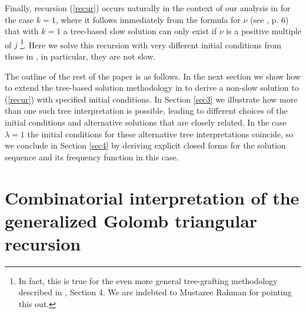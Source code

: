 \documentclass[12pt]{amsart}
\numberwithin{equation}{section}
\numberwithin{theorem}{section}
\numberwithin{table}{section}
\numberwithin{figure}{section}
\begin{document}
\iffalse
; concurrently, as we soon show, we identified that the initial conditions of interest consist of $s+1$ 1s followed by $j$ repetitions of the value $j+1$.

The natural generalization of Golomb's recursion with $j=\lambda=1$ but any $s \geq 0$ and $s+1$ initial values all equal to 1 is discussed briefly in \cite{Rpaper} and \cite{NonHomog}. There it is observed that the solution has a combinatorial interpretation in terms of counting leaves in a certain infinite unary tree, so is slow, and has frequency function $\phi(n) = n + s$. For instance, $g_{1,2}(n)$ generates the sequence 1, 1, 1, 2, 2, 2, 2, 3, 3, 3, 3, 3, 4, 4, 4, 4, 4, 4, \ldots.

Based on our extensive experience with such recursions, it seemed natural to consider using a string of 1s of sufficient length to ensure that the recursion stayed defined (see \cite{BKT, CCT, Rpaper} for various examples of nested recursions with such initial conditions providing interesting results). Very quickly we identified

\fi

Finally, recursion (\ref{recur}) occurs naturally in the context of our analysis in \cite{NonHomog} for the case $k=1$, where it follows immediately from the formula for $\nu$ (see \cite{NonHomog}, p. 6) that with $k=1$ a tree-based slow solution can only exist if $\nu$ is a positive multiple of $j$ \footnote{In fact, this is true for the even more general tree-grafting methodology described in \cite{NonHomog}, Section 4. We are indebted to Mustazee Rahman for pointing this out.}. Here we solve this recursion with very different initial conditions from those in \cite{NonHomog}, in particular, they are not slow.

The outline of the rest of the paper is as follows. In the next section we show how to extend the tree-based solution methodology in \cite{NonHomog} to derive a non-slow solution to (\ref{recur}) with specified initial conditions. In Section \ref{sec3} we illustrate how more than one such tree interpretation is possible, leading to different choices of the initial conditions and alternative solutions that are closely related. In the case $\lambda=1$ the initial conditions for these alternative tree interpretations coincide, so we conclude in Section \ref{sec4} by deriving explicit closed forms for the solution sequence and its frequency function in this case.

\section{Combinatorial interpretation of the generalized Golomb triangular recursion} \label{sec2}
\end{document}
